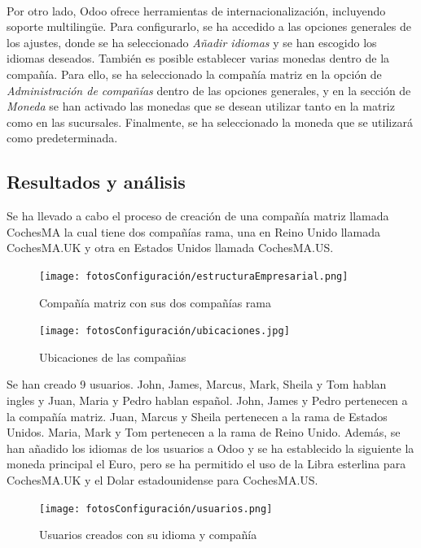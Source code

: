 \paragraph{}
Por otro lado, Odoo ofrece herramientas de internacionalización, incluyendo soporte multilingüe. Para configurarlo, se ha accedido a las opciones generales de los ajustes, donde se ha seleccionado \textit{Añadir idiomas} y se han escogido los idiomas deseados. También es posible establecer varias monedas dentro de la compañía. Para ello, se ha seleccionado la compañía matriz en la opción de \textit{Administración de compañías} dentro de las opciones generales, y en la sección de \textit{Moneda} se han activado las monedas que se desean utilizar tanto en la matriz como en las sucursales. Finalmente, se ha seleccionado la moneda que se utilizará como predeterminada.
\subsection{Resultados y análisis}
Se ha llevado a cabo el proceso de creación de una compañía matriz llamada CochesMA la cual tiene dos compañías rama, una en Reino Unido llamada CochesMA.UK y otra en Estados Unidos llamada CochesMA.US.
\begin{figure}[h]
    \centering
    \texttt{[image: fotosConfiguración/estructuraEmpresarial.png]}
    \caption{Compañía matriz con sus dos compañías rama}
    \label{fig:enter-label}
\end{figure}
\begin{figure}[h]
    \centering
    \texttt{[image: fotosConfiguración/ubicaciones.jpg]}
    \caption{Ubicaciones de las compañias}
    \label{fig:enter-label}
\end{figure}
Se han creado 9 usuarios. John, James, Marcus, Mark, Sheila y Tom hablan ingles y Juan, Maria y Pedro hablan español. John, James y Pedro pertenecen a la compañía matriz. Juan, Marcus y Sheila pertenecen a la rama de Estados Unidos. Maria, Mark y Tom pertenecen a la rama de Reino Unido.
Además, se han añadido los idiomas de los usuarios a Odoo y se ha establecido la siguiente la moneda principal el Euro, pero se ha permitido el uso de la Libra esterlina para CochesMA.UK y el Dolar estadounidense para CochesMA.US. 
\begin{figure}[h]
    \centering
    \texttt{[image: fotosConfiguración/usuarios.png]}
    \caption{Usuarios creados con su idioma y compañía}
    \label{fig:enter-label}
\end{figure}


